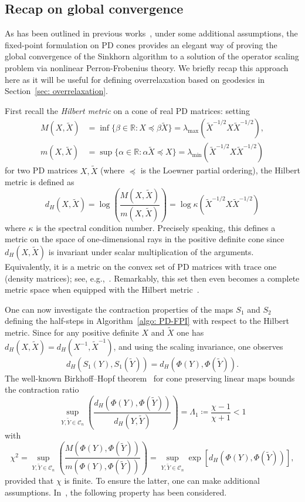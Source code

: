 \documentclass[a4paper]{article}
\newcommand{\R}{\mathbb{R}}
\newcommand{\caC}{\mathcal{C}}
\theoremstyle{definition}
\numberwithin{equation}{section}
\begin{document}
\subsection{Recap on global convergence}

As has been outlined in previous works~\cite{Georgiou2015,Idel2016}, under some additional assumptions, the fixed-point formulation on PD cones provides an elegant way of proving the global convergence of the Sinkhorn algorithm to a solution of the operator scaling problem via nonlinear Perron-Frobenius theory. We briefly recap this approach here as it will be useful for defining overrelaxation based on geodesics in Section~\ref{sec: overrelaxation}. 

First recall the \emph{Hilbert metric} on a cone of real PD matrices: setting
\begin{align*}
 M(X, \tilde X) &= \inf\{\beta \in \R : X \preceq \beta \tilde X\} = \lambda_{\max}(\tilde X^{-1/2} X \tilde X^{-1/2}), \\
 m(X, \tilde X) &= \sup\{\alpha \in \R :  \alpha \tilde X  \preceq X \} = \lambda_{\min}(\tilde X^{-1/2} X \tilde X^{-1/2})
\end{align*}
for two PD matrices $X, \tilde X$ (where $\preceq$ is the Loewner partial ordering), the Hilbert metric is defined as 
\[
 d_H(X, \tilde X) = \log \left(\frac{M(X, \tilde X)}{m(X, \tilde X)}\right) = \log \kappa(\tilde X^{-1/2} X \tilde X^{-1/2})
\]
where $\kappa$ is the spectral condition number. Precisely speaking, this defines a metric on the space of one-dimensional rays in the positive definite cone since $d_H(X, \tilde X)$ is invariant under scalar multiplication of the arguments. Equivalently, it is a metric on the convex set of PD matrices with trace one (density matrices); see, e.g.,~\cite[Chapter~2]{Lemmens2012}. Remarkably, this set then even becomes a complete metric space when equipped with the Hilbert metric~\cite[Proposition~2.5.4]{Lemmens2012}.

One can now investigate the contraction properties of the maps $S_1$ and $S_2$ defining the half-steps in Algorithm~\ref{algo: PD-FPI} with respect to the Hilbert metric. Since for any positive definite $X$ and $\tilde X$ one has $d_H(X,\tilde X) = d_H(X^{-1}, {\tilde X}^{-1})$, and using the scaling invariance, one observes
\[
 d_H(S_1(Y),S_1(\tilde Y)) = d_H(\Phi(Y),\Phi(\tilde Y)).
\]
The well-known Birkhoff--Hopf theorem~\cite[Theorem~3.5]{Eveson1995} for cone preserving linear maps bounds the contraction ratio
\begin{equation}\label{eq: contraction ratio}
 \sup_{Y, \tilde Y \in \caC_n} \left( \frac{d_H(\Phi(Y),\Phi(\tilde Y))}{d_H(Y,\tilde Y)} \right) = \Lambda_1 \coloneqq \frac{\chi - 1}{\chi + 1} < 1
\end{equation}
with
\[
 \chi^2 = \sup_{Y,\tilde Y \in \caC_n} \left( \frac{M(\Phi(Y),\Phi(\tilde Y))}{m(\Phi(Y),\Phi(\tilde Y))} \right) = \sup_{Y,\tilde Y \in \caC_n} \exp [ d_H(\Phi(Y), \Phi(\tilde Y))],
\]
provided that $\chi$ is finite. To ensure the latter, one can make additional assumptions. In~\cite{Georgiou2015}, the following property has been considered.
\end{document}
